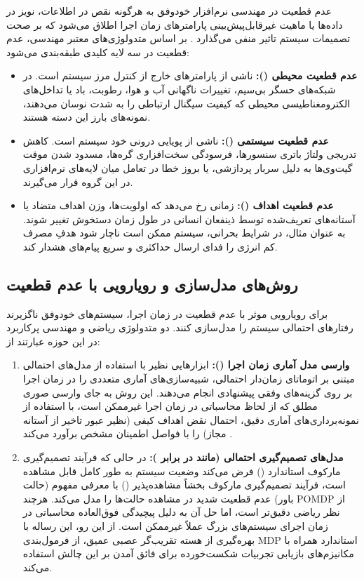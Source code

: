 \documentclass[oneside,openany,phd]{TMU-Thesis}
\begin{document}
عدم قطعیت در مهندسی نرم‌افزار خودوفق به هرگونه نقص در اطلاعات، نویز در داده‌ها یا ماهیت غیرقابل‌پیش‌بینی پارامترهای زمان اجرا اطلاق می‌شود که بر صحت تصمیمات سیستم تاثیر منفی می‌گذارد \cite{cheng2009software}. بر اساس متدولوژی‌های معتبر مهندسی، عدم قطعیت در سه لایه کلیدی طبقه‌بندی می‌شود:
\begin{itemize}
    \item \textbf{عدم قطعیت محیطی ():} ناشی از پارامترهای خارج از کنترل مرز سیستم است. در شبکه‌های حسگر بی‌سیم، تغییرات ناگهانی آب و هوا، رطوبت، باد یا تداخل‌های الکترومغناطیسی محیطی که کیفیت سیگنال ارتباطی را به شدت نوسان می‌دهند، نمونه‌های بارز این دسته هستند.
    \item \textbf{عدم قطعیت سیستمی ():} ناشی از پویایی درونی خود سیستم است. کاهش تدریجی ولتاژ باتری سنسورها، فرسودگی سخت‌افزاری گره‌ها، مسدود شدن موقت گیت‌وی‌ها به دلیل سربار پردازشی، یا بروز خطا در تعامل میان لایه‌های نرم‌افزاری در این گروه قرار می‌گیرند.
    \item \textbf{عدم قطعیت اهداف ():} زمانی رخ می‌دهد که اولویت‌ها، وزن اهداف متضاد یا آستانه‌های تعریف‌شده توسط ذینفعان انسانی در طول زمان دستخوش تغییر شوند. به عنوان مثال، در شرایط بحرانی، سیستم ممکن است ناچار شود هدفِ مصرف کم انرژی را فدای ارسال حداکثری و سریع پیام‌های هشدار کند.
\end{itemize}

\subsection{روش‌های مدل‌سازی و رویارویی با عدم قطعیت}

برای رویارویی موثر با عدم قطعیت در زمان اجرا، سیستم‌های خودوفق ناگزیرند رفتارهای احتمالی سیستم را مدل‌سازی کنند. دو متدولوژی ریاضی و مهندسی پرکاربرد در این حوزه عبارتند از:
\begin{enumerate}
    \item \textbf{وارسی مدل آماری زمان اجرا ():} ابزارهایی نظیر  با استفاده از مدل‌های احتمالی مبتنی بر اتوماتای زمان‌دار احتمالی، شبیه‌سازی‌های آماری متعددی را در زمان اجرا بر روی گزینه‌های وفقی پیشنهادی انجام می‌دهند. این روش به جای وارسی صوری مطلق که از لحاظ محاسباتی در زمان اجرا غیرممکن است، با استفاده از نمونه‌برداری‌های آماری دقیق، احتمال نقض اهداف کیفی (نظیر عبور تاخیر از آستانه مجاز) را با فواصل اطمینان مشخص برآورد می‌کند \cite{david2015uppaal}.
    \item \textbf{مدل‌های تصمیم‌گیری احتمالی (مانند  در برابر ):} در حالی که فرآیند تصمیم‌گیری مارکوف استاندارد () فرض می‌کند وضعیت سیستم به طور کامل قابل مشاهده است، فرآیند تصمیم‌گیری مارکوف بخشاً مشاهده‌پذیر () با معرفی مفهوم  (حالت باور) عدم قطعیت شدید در مشاهده حالت‌ها را مدل می‌کند. هرچند POMDP از نظر ریاضی دقیق‌تر است، اما حل آن به دلیل پیچیدگی فوق‌العاده محاسباتی در زمان اجرای سیستم‌های بزرگ عملاً غیرممکن است. از این رو، این رساله با بهره‌گیری از هسته تقریب‌گر عصبی عمیق، از فرمول‌بندی MDP استاندارد همراه با مکانیزم‌های بازیابی تجربیات شکست‌خورده برای فائق آمدن بر این چالش استفاده می‌کند.
\end{enumerate}
\end{document}
